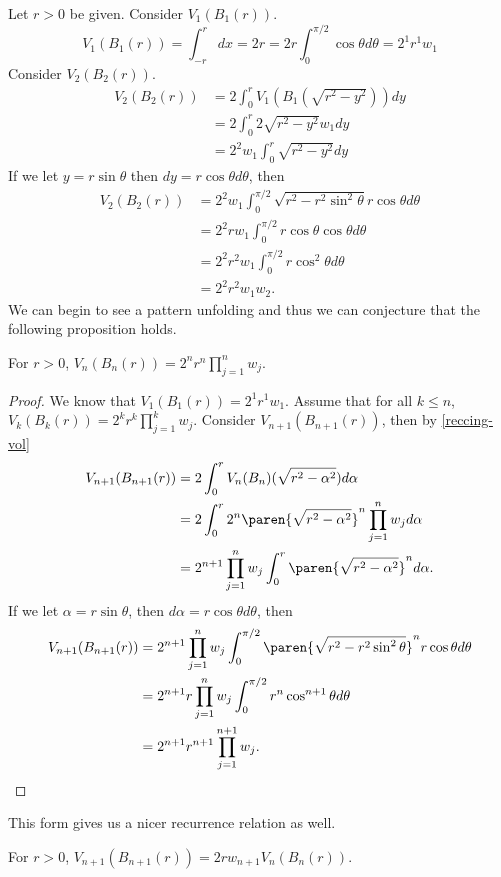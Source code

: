 Let $r>0$ be given.
Consider $V_1(B_1(r))$.
\[
	V_1(B_1(r)) = \int_{-r}^r dx = 2r = 2r\int_0^{\pi/2}\cos\theta d\theta=2^1r^1w_1
\]
Consider $V_2(B_2(r))$.
\begin{align*}
	V_2(B_2(r)) &= 2\int_{0}^r V_1(B_1(\sqrt{r^2-y^2})) dy\\
	&= 2\int_{0}^r 2\sqrt{r^2-y^2} w_1 dy\\
	&= 2^2 w_1\int_{0}^r \sqrt{r^2-y^2} dy
\end{align*}
If we let $y=r\sin\theta$ then $dy=r\cos\theta d\theta$, then
\begin{align*}
	V_2(B_2(r))&=2^2 w_1 \int_0^{\pi/2}\sqrt{r^2-r^2\sin^2\theta}r\cos\theta d\theta\\
	&= 2^2 r w_1 \int_0^{\pi/2}r\cos\theta\cos\theta d\theta\\
	&= 2^2 r^2 w_1 \int_0^{\pi/2}r\cos^2\theta d\theta\\
	&= 2^2 r^2 w_1 w_2.
\end{align*}
We can begin to see a pattern unfolding and thus we can conjecture that the following proposition holds.
\begin{proposition}\label{vol-wallis-form}
	For $r>0$, $V_n(B_n(r)) = 2^n r^n \prod_{j=1}^n w_j$.
\end{proposition}
\begin{proof}
	We know that $V_1(B_1(r))=2^1r^1w_1$.
	Assume that for all $k \leq n$, $V_k(B_k(r))=2^k r^k \prod_{j=1}^k w_j$.
	Consider $V_{n+1}(B_{n+1}(r))$, then by \autoref{reccing-vol}
	\begin{align*}
		V_{n+1}(B_{n+1}(r)) &= 2\int_{0}^r V_{n}(B_{n})(\sqrt{r^2-\alpha^2})d\alpha\\
		&= 2\int_{0}^r 2^n {\paren{\sqrt{r^2-\alpha^2}}}^n \prod_{j=1}^n w_j d\alpha\\
		&=2^{n+1}\prod_{j=1}^n w_j \int_{0}^r {\paren{\sqrt{r^2-\alpha^2}}}^n d\alpha.
	\end{align*}
	If we let $\alpha = r\sin\theta$, then $d\alpha = r\cos\theta d\theta$, then
	\begin{align*}
		V_{n+1}(B_{n+1}(r)) &= 2^{n+1}\prod_{j=1}^n w_j \int_{0}^{\pi/2} {\paren{\sqrt{r^2-r^2\sin^2\theta}}}^n r\cos\theta d\theta\\
		&=2^{n+1} r\prod_{j=1}^n w_j\int_{0}^{\pi/2}r^n \cos^{n+1}\theta d\theta\\
		&=2^{n+1} r^{n+1}\prod_{j=1}^{n+1} w_j.
	\end{align*}
\end{proof}
This form gives us a nicer recurrence relation as well.
\begin{corollary}\label{vol-nice-rec}
	For $r>0$, $V_{n+1}(B_{n+1}(r))=2rw_{n+1}V_{n}(B_{n}(r))$.
\end{corollary}
